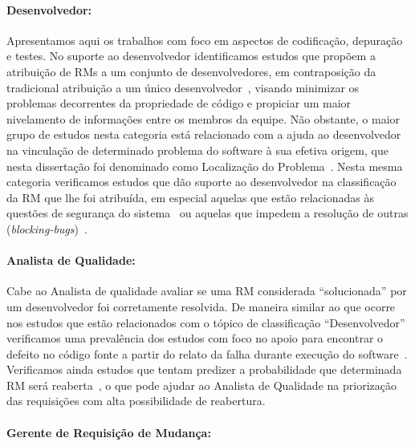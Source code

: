 \paragraph{Desenvolvedor:}

Apresentamos aqui os trabalhos com foco em aspectos de co\-di\-fi\-ca\-ção,
depuração e testes. No suporte ao desenvolvedor identificamos estudos que
propõem a atribuição de RMs a um conjunto de desenvolvedores, em contraposição
da tradicional atribuição a um único desenvolvedor~\cite{banitaan2013decoba},
visando minimizar os pro\-ble\-mas decorrentes da propriedade de código e
propiciar um maior nivelamento de informações entre os membros da equipe. Não
obstante, o maior grupo de estudos nesta categoria está relacionado com a ajuda
ao desenvolvedor na vinculação de determinado problema do software à sua efetiva
origem, que nesta dissertação foi denominado como Localização do
Problema~\cite{corley2011recovering,Wong:2014:BBF:2705615.2706096,
    Thung:2014:BIT:2635868.2661678,Nguyen:2012:MAR:2393596.2393671,thung2013automatic,
    Romo:2015:TAT:2745802.2745833}. Nesta mesma categoria verificamos estudos
que dão suporte ao desenvolvedor na classificação da RM que lhe foi atribuída,
em especial aquelas que estão relacionadas às questões de segurança do
sistema~\cite{gegick2010identifying} ou aquelas que impedem a resolução de
outras (\textit{blocking-bugs})~\cite{ValdiviaGarcia:2014:CPB:2597073.2597099}.

\paragraph{Analista de Qualidade:}

Cabe ao Analista de qualidade avaliar se uma RM considerada ``solucionada'' por
um desenvolvedor foi corretamente resolvida. De maneira similar ao que ocorre
nos estudos que estão relacionados com o tópico de classificação
``Desenvolvedor'' verificamos uma prevalência dos estudos com foco no apoio para
encontrar o defeito no código fonte a partir do relato da falha durante execução
do software~\cite{corley2011recovering,Wong:2014:BBF:2705615.2706096,
    Thung:2014:BIT:2635868.2661678,Nguyen:2012:MAR:2393596.2393671,thung2013automatic,
    Romo:2015:TAT:2745802.2745833}. Verificamos ainda estudos que tentam
predizer a probabilidade que determinada RM será
reaberta~\cite{xia2015automatic}, o que pode ajudar ao Analista de Qualidade na
priorização das requisições com alta possibilidade de reabertura.

\paragraph{Gerente de Requisição de	Mudança:}

